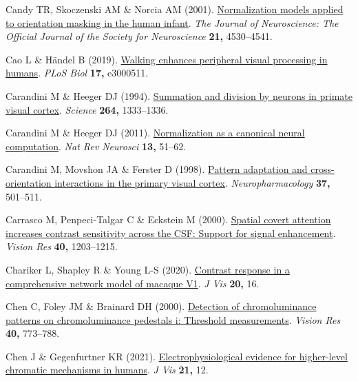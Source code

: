 \documentclass[
  letterpaper,
  DIV=11,
  numbers=noendperiod]{scrartcl}
\newlength{\cslhangindent}
\newenvironment{CSLReferences}[2] %
 {\begin{list}{}{%
  \setlength{\itemindent}{0pt}
  \setlength{\leftmargin}{0pt}
  \setlength{\parsep}{0pt}
  \ifodd #1
   \setlength{\leftmargin}{\cslhangindent}
   \setlength{\itemindent}{-1\cslhangindent}
  \fi
  \setlength{\itemsep}{#2\baselineskip}}}
 {\end{list}}
\begin{document}
\begin{CSLReferences}{1}{1}
Candy TR, Skoczenski AM \& Norcia AM (2001).
\href{https://doi.org/10.1523/JNEUROSCI.21-12-04530.2001}{Normalization
models applied to orientation masking in the human infant}. \emph{The
Journal of Neuroscience: The Official Journal of the Society for
Neuroscience} \textbf{21,} 4530--4541.

Cao L \& Händel B (2019).
\href{https://doi.org/10.1371/journal.pbio.3000511}{Walking enhances
peripheral visual processing in humans}. \emph{PLoS Biol} \textbf{17,}
e3000511.

Carandini M \& Heeger DJ (1994).
\href{https://doi.org/10.1126/science.8191289}{Summation and division by
neurons in primate visual cortex}. \emph{Science} \textbf{264,}
1333--1336.

Carandini M \& Heeger DJ (2011).
\href{https://doi.org/10.1038/nrn3136}{Normalization as a canonical
neural computation}. \emph{Nat Rev Neurosci} \textbf{13,} 51--62.

Carandini M, Movshon JA \& Ferster D (1998).
\href{https://doi.org/10.1016/s0028-3908(98)00069-0}{Pattern adaptation
and cross-orientation interactions in the primary visual cortex}.
\emph{Neuropharmacology} \textbf{37,} 501--511.

Carrasco M, Penpeci-Talgar C \& Eckstein M (2000).
\href{https://doi.org/10.1016/s0042-6989(00)00024-9}{Spatial covert
attention increases contrast sensitivity across the CSF: Support for
signal enhancement}. \emph{Vision Res} \textbf{40,} 1203--1215.

Chariker L, Shapley R \& Young L-S (2020).
\href{https://doi.org/10.1167/jov.20.4.16}{Contrast response in a
comprehensive network model of macaque V1}. \emph{J Vis} \textbf{20,}
16.

Chen C, Foley JM \& Brainard DH (2000).
\href{https://doi.org/10.1016/s0042-6989(99)00227-8}{Detection of
chromoluminance patterns on chromoluminance pedestals i: Threshold
measurements}. \emph{Vision Res} \textbf{40,} 773--788.

Chen J \& Gegenfurtner KR (2021).
\href{https://doi.org/10.1167/jov.21.8.12}{Electrophysiological evidence
for higher-level chromatic mechanisms in humans}. \emph{J Vis}
\textbf{21,} 12.


\end{CSLReferences}
\end{document}
